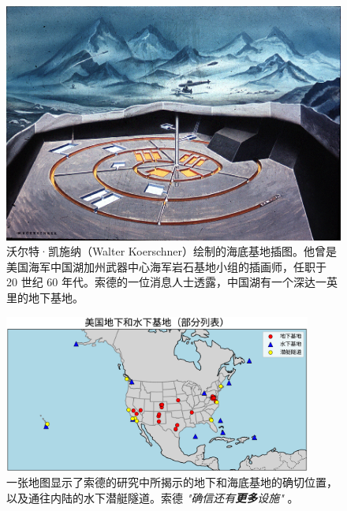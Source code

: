 \documentclass[10pt,twocolumn,letterpaper]{article}
\begin{document}
\begin{figure}[t]
\begin{center}
   \includegraphics[width=1\linewidth]{undersea.jpg}
\end{center}
   \caption{沃尔特·凯施纳（Walter Koerschner）绘制的海底基地插图。他曾是美国海军中国湖加州武器中心海军岩石基地小组的插画师，任职于 20 世纪 60 年代。索德的一位消息人士透露，中国湖有一个深达一英里的地下基地\cite{22,23}。}
\label{fig:5}
\label{fig:onecol}
\end{figure}

\begin{figure}[t]
\begin{center}
\includegraphics[width=0.9\textwidth]{baseschn.png}
\end{center}
   \caption{一张地图显示了索德的研究中所揭示的地下和海底基地的确切位置，以及通往内陆的水下潜艇隧道。索德 \textit{"确信还有\textbf{更多}设施"} \cite{22}。}
   \label{fig:4}
\end{figure}
\end{document}
